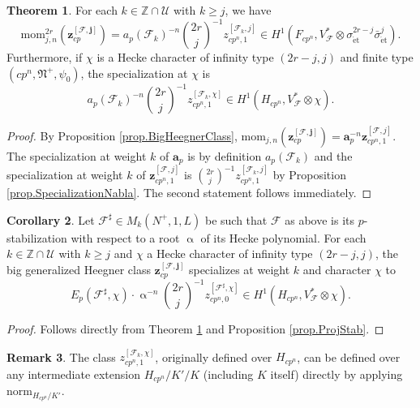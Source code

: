 \documentclass[a4paper]{amsart}
\numberwithin{equation}{section}
\theoremstyle{definition}
\newtheorem{theorem}{Theorem}[section]
\newtheorem{corollary}[theorem]{Corollary}
\newtheorem{remark}[theorem]{Remark}
\newcommand{\Z}{\mathbb{Z}}
\DeclareMathOperator{\et}{\text{\'et}}
\newcommand{\norm}{\mathrm{norm}}
\renewcommand{\et}{\mathrm{\acute{e}t}}
\begin{document}
\begin{theorem}\label{teo.Specialization}
For each $k\in\Z\cap\mathscr{U}$ with $k\geq j$, we have \[\mathrm{mom}^{2r}_{j,n}\left(\mathbf{z}_{cp}^{[\mathscr{F},\mathbf{j}]}\right)=a_p(\mathcal{F}_k)^{-n}\binom{2r}{j}^{-1}z_{cp^n,1}^{[\mathcal{F}_{k},j]}\in H^1(F_{cp^n},V_{\mathscr{F}}^*\otimes\sigma^{2r-j}_{\et}\bar{\sigma}^j_{\et}).\] Furthermore, if $\chi$ is a Hecke character of infinity type $(2r-j,j)$ and finite type $(cp^n, \mathfrak{N}^+, \psi_0)$, the specialization at $\chi$ is \[a_p(\mathcal{F}_k)^{-n}\binom{2r}{j}^{-1}z_{cp^n,1}^{[\mathcal{F}_{k},\chi]}\in H^1(H_{cp^n},V_{\mathscr{F}}^\ast\otimes\chi).\]
\end{theorem}
\begin{proof}
By Proposition \ref{prop.BigHeegnerClass}, $\mathrm{mom}_{j,n}(\mathbf{z}_{cp}^{[\mathscr{F},\mathbf{j}]})=\mathbf{a}_p^{-n}\mathbf{z}^{[\mathscr{F},j]}_{cp^n,1}$. The specialization at weight $k$ of $\mathbf{a}_p$ is by definition $a_p(\mathcal{F}_k)$ and the specialization at weight $k$ of $\mathbf{z}^{[\mathscr{F},j]}_{cp^n,1}$ is $\binom{2r}{j}^{-1}z_{cp^n,1}^{[\mathcal{F}_{k},j]}$ by Proposition \ref{prop.SpecializationNabla}. The second statement follows immediately.
\end{proof}

\begin{corollary}
Let $\mathcal{F}^\sharp\in M_k(N^+,1,L)$ be such that $\mathcal{F}$ as above is its $p$-stabilization with respect to a root $\upalpha$ of its Hecke polynomial. For each $k\in\Z\cap\mathscr{U}$ with $k\geq j$ and $\chi$ a Hecke character of infinity type $(2r-j,j)$, the big generalized Heegner class $\mathbf{z}_{cp}^{[\mathscr{F},\mathbf{j}]}$ specializes at weight $k$ and character $\chi$ to \[E_p(\mathcal{F}^{\sharp},\chi)\cdot\upalpha^{-n}\binom{2r}{j}^{-1}z_{cp^n,0}^{[\mathcal{F}^\sharp,\chi]}\in H^1(H_{cp^n},V_{\mathscr{F}}^*\otimes\chi).\]
\end{corollary}
\begin{proof}
Follows directly from Theorem \ref{teo.Specialization} and Proposition \ref{prop.ProjStab}.
\end{proof}

\begin{remark}
The class $z_{cp^n,1}^{[\mathcal{F}_k,\chi]}$, originally defined over $H_{cp^n}$, can be defined over any intermediate extension $H_{cp^n}/K'/K$ (including $K$ itself) directly by applying $\norm_{H_{cp^n}/K'}$.
\end{remark}
\end{document}
